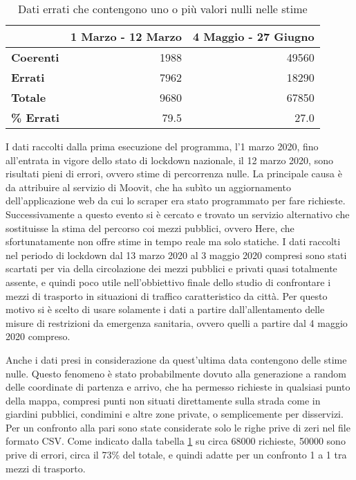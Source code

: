 \begin{table}[H]
\centering
\begin{tabular}{ | l | r | r | }
\hline

& \textbf{1 Marzo - 12 Marzo} & \textbf{4 Maggio - 27 Giugno} \\
\hline

\textbf{Coerenti}& 1988 & 49560 \\  
\textbf{Errati} & 7962 & 18290 \\
\hline
\textbf{Totale} & 9680 & 67850 \\
\textbf{\% Errati} & 79.5 & 27.0 \\
\hline
\end{tabular}
\caption{Dati errati che contengono uno o più valori nulli nelle stime}
\label{table:1}
\end{table}

I dati raccolti dalla prima esecuzione del programma, l'1 marzo 2020, fino all'entrata in vigore dello stato di lockdown nazionale, il 12 marzo 2020, sono risultati pieni di errori, ovvero stime di percorrenza nulle. La principale causa è da attribuire al servizio di Moovit, che ha subìto un aggiornamento dell'applicazione web da cui lo scraper era stato programmato per fare richieste. Successivamente a questo evento si è cercato e trovato un servizio alternativo che sostituisse la stima del percorso coi mezzi pubblici, ovvero Here, che sfortunatamente non offre stime in tempo reale ma solo statiche. I dati raccolti nel periodo di lockdown dal 13 marzo 2020 al 3 maggio 2020 compresi sono stati scartati per via della circolazione dei mezzi pubblici e privati quasi totalmente assente, e quindi poco utile nell'obbiettivo finale dello studio di confrontare i mezzi di trasporto in situazioni di traffico caratteristico da città. Per questo motivo si è scelto di usare solamente i dati a partire dall'allentamento delle misure di restrizioni da emergenza sanitaria, ovvero quelli a partire dal 4 maggio 2020 compreso.

Anche i dati presi in considerazione da quest'ultima data contengono delle stime nulle. Questo fenomeno è stato probabilmente dovuto alla generazione a random delle coordinate di partenza e arrivo, che ha permesso richieste in qualsiasi punto della mappa, compresi punti non situati direttamente sulla strada come in giardini pubblici, condimini e altre zone private, o semplicemente per disservizi. Per un confronto alla pari sono state considerate solo le righe prive di zeri nel file formato CSV. Come indicato dalla tabella \ref{table:1} su circa 68000 richieste, 50000 sono prive di errori, circa il 73\% del totale, e quindi adatte per un confronto 1 a 1 tra mezzi di trasporto.

